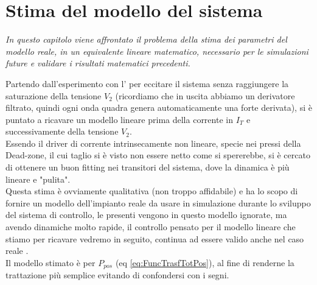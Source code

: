 \chapter{Stima del modello del sistema}\label{cap:stimaModello}

\begin{minipage}{12cm}\textit{
		In questo capitolo viene affrontato il problema della stima dei parametri del modello reale, in un equivalente lineare matematico, necessario per le simulazioni future e validare i risultati matematici precedenti.}
\end{minipage}

\vspace*{1cm}
\noindent
Partendo dall'esperimento con l' per eccitare il sistema senza raggiungere la saturazione della tensione $ V_2 $ (ricordiamo che in uscita abbiamo un derivatore filtrato, quindi ogni onda quadra genera automaticamente una forte derivata), si è puntato a ricavare un modello lineare prima della corrente in $ I_T $ e successivamente della tensione $ V_2 $.\\
Essendo il driver di corrente intrinsecamente non lineare, specie nei pressi della Dead-zone, il cui taglio si è visto non essere netto come si spererebbe, si è cercato di ottenere un buon fitting nei transitori del sistema, dove la dinamica è più lineare e "pulita".\\
Questa stima è ovviamente qualitativa (non troppo affidabile) e ha lo scopo di fornire un modello dell'impianto reale da usare in simulazione durante lo sviluppo del sistema di controllo, le \nonLinearita presenti vengono in questo modello ignorate, ma avendo dinamiche molto rapide, il controllo pensato per il modello lineare che stiamo per ricavare vedremo in seguito, continua ad essere valido anche nel caso reale \nonLineare.\\
Il modello stimato è per $ P_{pos} $ (eq \ref{eq:FuncTrasfTotPos}), al fine di renderne la trattazione più semplice evitando di confondersi con i segni.

\newpage

